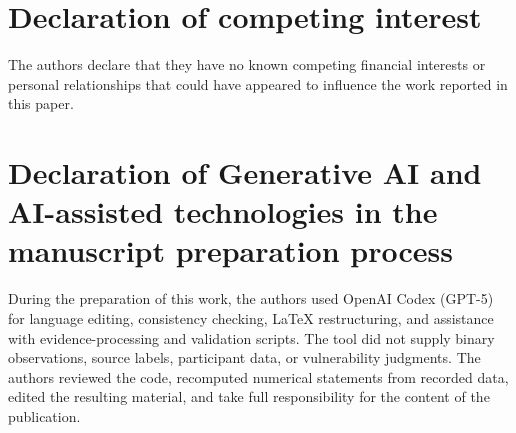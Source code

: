 \documentclass[a4paper,fleqn]{cas-dc}
\begin{document}
\section*{Declaration of competing interest}

The authors declare that they have no known competing financial interests or personal relationships that could have appeared to influence the work reported in this paper.

\section*{Declaration of Generative AI and AI-assisted technologies in the manuscript preparation process}

During the preparation of this work, the authors used OpenAI Codex (GPT-5) for language editing, consistency checking, LaTeX restructuring, and assistance with evidence-processing and validation scripts. The tool did not supply binary observations, source labels, participant data, or vulnerability judgments. The authors reviewed the code, recomputed numerical statements from recorded data, edited the resulting material, and take full responsibility for the content of the publication.



\end{document}

